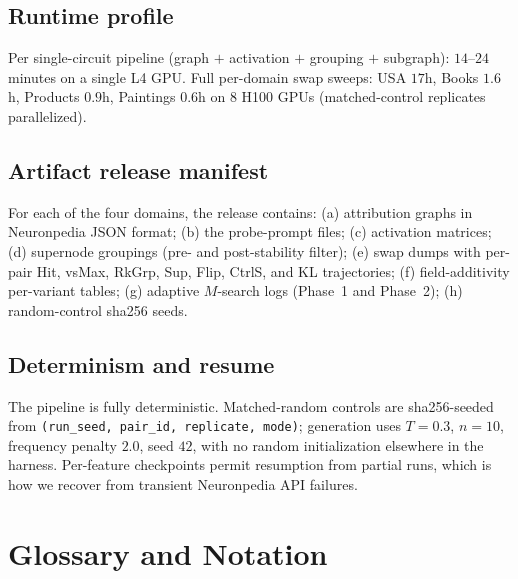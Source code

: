 \subsection{Runtime profile}
Per single-circuit pipeline (graph $+$ activation $+$ grouping $+$ subgraph): $14$--$24$ minutes on a single L4 GPU. Full per-domain swap sweeps: USA $17$h, Books $1.6$h, Products $0.9$h, Paintings $0.6$h on 8 H100 GPUs (matched-control replicates parallelized).

\subsection{Artifact release manifest}
For each of the four domains, the release contains: (a) attribution graphs in Neuronpedia JSON format; (b) the probe-prompt files; (c) activation matrices; (d) supernode groupings (pre- and post-stability filter); (e) swap dumps with per-pair Hit, vsMax, RkGrp, Sup, Flip, CtrlS, and KL trajectories; (f) field-additivity per-variant tables; (g) adaptive $M$-search logs (Phase~1 and Phase~2); (h) random-control sha256 seeds.

\subsection{Determinism and resume}
The pipeline is fully deterministic. Matched-random controls are sha256-seeded from \texttt{(run\_seed, pair\_id, replicate, mode)}; generation uses $T{=}0.3$, $n{=}10$, frequency penalty $2.0$, seed $42$, with no random initialization elsewhere in the harness. Per-feature checkpoints permit resumption from partial runs, which is how we recover from transient Neuronpedia API failures.

\section{Glossary and Notation}
\label{appx:glossary}

